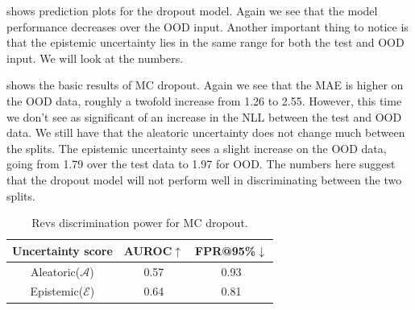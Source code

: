   
  

 shows prediction plots for the dropout model. Again we see that the model performance decreases over the OOD input. Another important thing to notice is that the epistemic uncertainty lies in the same range for both the test and OOD input. We will look at the numbers.

 shows the basic results of MC dropout. Again we see that the MAE is higher on the OOD data, roughly a twofold increase from 1.26 to 2.55. However, this time we don't see as significant of an increase in the NLL between the test and OOD data. 
We still have that the aleatoric uncertainty does not change much between the splits. The epistemic uncertainty sees a slight increase on the OOD data, going from 1.79 over the test data to 1.97 for OOD. The numbers here suggest that the dropout model will not perform well in discriminating between the two splits.


\begin{table}[htbp]
\centering
    \begin{tabular}{c  c  c}  
        \toprule
        Uncertainty score & AUROC$\uparrow$ & FPR@95\%$\downarrow$\\
        \midrule
        Aleatoric($\mathcal{A}$) & 0.57  & 0.93\\
        Epistemic($\mathcal{E}$) & 0.64 &  0.81 \\
        \midrule
    \end{tabular}
    \caption{Revs discrimination power for MC dropout.}
    \label{tbl:revs_dropout_discrimination}
\end{table}


